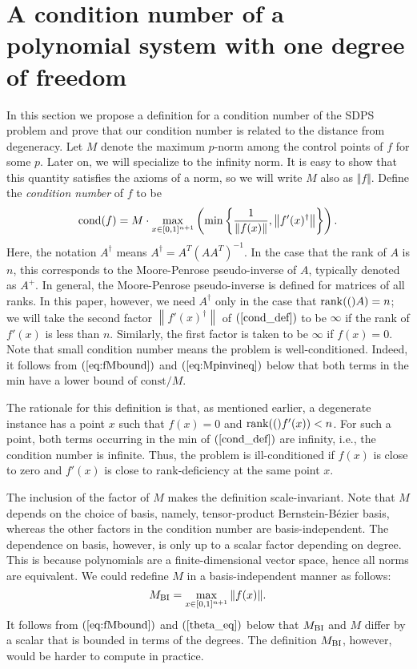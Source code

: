 \documentclass{article}
\newcommand{\cond}[1]{\mathop{\rm{cond}}(#1)}
\newcommand{\norm}[1]{\left\|#1\right\|} \newcommand{\norma}[1]{\left\|#1\right\|}   \newcommand{\inv}[1]{#1^{-1}}
\newcommand{\mpinv}[1]{#1^{\dagger}}  \newcommand\eps{\epsilon}
\newcommand\eref[1]{$(\ref{#1})$}
\newcommand{\rank}[1]{\mathop{\rm{rank}}(#1)}
\begin{document}
\section{A condition number of a polynomial system with one degree of freedom}
\label{section_cond}

In this section we propose a definition for a condition number of the SDPS problem and prove that our condition number is related to the distance
from degeneracy.  Let $M$ denote the maximum $p$-norm among the control points of $f$ for some $p$.  
Later on, we will specialize to the infinity norm.
It is easy to show that this quantity satisfies
the axioms of a norm, so we will write $M$ also as $\Vert f\Vert$.
Define the {\em condition number} of $f$ to be
\begin{equation}
\label{cond_def} \cond{f} = M\cdot \max_{x \in [0,1]^{n+1}} \left( \min
\left\{{\frac{1}{\norm{f(x)}}}, \norm{\mpinv{f'(x)}}\right\}
\right).
\end{equation}
Here, the notation $A^\dagger$
means $A^\dagger = A^T(AA^T)^{-1}$.  In the case that
the rank of $A$ is $n$, this corresponds to the Moore-Penrose
pseudo-inverse of $A$, typically denoted as $A^+$.  In general,
the Moore-Penrose pseudo-inverse is defined for matrices of all ranks.
In this paper, however, we need $A^\dagger$ only in the case that
$\rank(A)=n$; we will 
take the second factor $\norm{\mpinv{f'(x)}}$ of \eref{cond_def}
to be $\infty$ if the rank of $f'(x)$ is
less than $n$.
Similarly, the first factor is taken to be $\infty$ if $f(x)=0$.
Note that small condition number means the problem is
well-conditioned.
Indeed, it follows
from \eref{eq:fMbound} and \eref{eq:Mpinvineq} below
that both terms in the min have a lower bound of  $\mbox{const}/M$.

The rationale for this definition is that, as mentioned earlier,
a degenerate instance has a point $x$ such that $f(x)=0$ and
$\rank(f'(x))<n$.  For such a point, both terms occurring in the min
of \eref{cond_def}
are infinity, i.e., the condition number is infinite.  Thus, the
problem is ill-conditioned
if $f(x)$ is close to zero and $f'(x)$ is close
to rank-deficiency at the same point $x$.


The inclusion of the factor
of $M$ makes the definition scale-invariant.  Note that $M$ depends
on the choice of basis, namely, tensor-product Bernstein-B\'ezier basis,
whereas the other factors in the condition number
are basis-independent.  The dependence on
basis, however, is only up to a scalar factor depending
on degree.  This is because polynomials are a finite-dimensional vector
space, hence all norms are equivalent.  We could redefine $M$ in a 
basis-independent manner as follows:
$$M_{\rm BI}=\max_{x\in[0,1]^{n+1}} \Vert f(x)\Vert.$$
It follows from \eref{eq:fMbound} and \eref{theta_eq}
below that $M_{\rm BI}$ and $M$ differ by a scalar
that is bounded in terms of the degrees.
The definition $M_{\rm BI}$, however, 
would be harder to compute
in practice.
\end{document}
